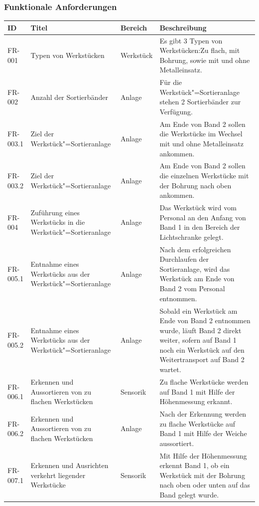 \documentclass[oneside,a4paper,titlepage]{scrartcl} %
\begin{document}
\subsubsection{Funktionale Anforderungen}
\begin{small}
 \begin{longtable}{|C{2cm}|L{4cm}|C{1.5cm}|L{5.5cm}|}
  \hline
  \textbf{ID} & \textbf{Titel} & \textbf{Bereich} & \textbf{Beschreibung}\\
  \toprule
  \endhead
  \hline
  FR-001 & Typen von Werkstücken & Werkstück & Es gibt 3 Typen von Werkstücken:Zu flach, mit Bohrung, sowie mit und ohne Metalleinsatz.\\
  \hline
   FR-002 & Anzahl der Sortierbänder & Anlage & Für die Werkstück"=Sortieranlage stehen 2 Sortierbänder zur Verfügung.\\
  \hline
  FR-003.1 & Ziel der Werkstück"=Sortieranlage & Anlage & Am Ende von Band 2 sollen die Werkstücke im Wechsel mit und ohne Metalleinsatz ankommen.\\
  \hline
  FR-003.2 & Ziel der Werkstück"=Sortieranlage & Anlage & Am Ende von Band 2 sollen die einzelnen Werkstücke mit der Bohrung nach oben ankommen.\\
  \hline
   FR-004 & Zuführung eines Werkstücks in die Werkstück"=Sortieranlage & Anlage & Das Werkstück wird vom Personal an den Anfang von Band 1 in den Bereich der Lichtschranke gelegt.\\
  \hline
  FR-005.1 & Entnahme eines Werkstücks aus der Werkstück"=Sortieranlage & Anlage & Nach dem erfolgreichen Durchlaufen der Sortieranlage, wird das Werkstück am Ende von Band 2 vom Personal entnommen.\\
  \hline
  FR-005.2 & Entnahme eines Werkstücks aus der Werkstück"=Sortieranlage & Anlage & Sobald ein Werkstück am Ende von Band 2 entnommen wurde, läuft Band 2 direkt weiter, sofern auf Band 1 noch ein Werkstück auf den Weitertransport auf Band 2 wartet.\\
  \hline
   FR-006.1 & Erkennen und Aussortieren von zu flachen Werkstücken & Sensorik & Zu flache Werkstücke werden auf Band 1 mit Hilfe der Höhenmessung erkannt.\\
  \hline
   FR-006.2 & Erkennen und Aussortieren von zu flachen Werkstücken & Anlage & Nach der Erkennung werden zu flache Werkstücke auf Band 1 mit Hilfe der Weiche aussortiert.\\
  \hline
  FR-007.1 & Erkennen und Ausrichten verkehrt liegender Werkstücke & Sensorik & Mit Hilfe der Höhenmessung erkennt Band 1, ob ein Werkstück mit der Bohrung nach oben oder unten auf das Band gelegt wurde.\\

\end{longtable}
\end{small}
\end{document}
